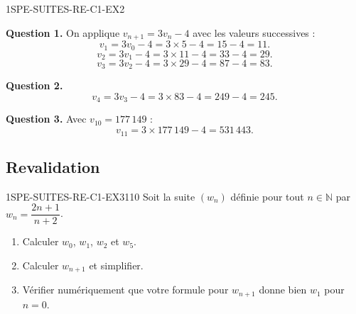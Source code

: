 
\begin{corrige}{1SPE-SUITES-RE-C1-EX2}


\textbf{Question 1.} On applique $v_{n+1} = 3v_n - 4$ avec les valeurs successives :
\[
v_1 = 3v_0 - 4 = 3 \times 5 - 4 = 15 - 4 = 11.
\]
\[
v_2 = 3v_1 - 4 = 3 \times 11 - 4 = 33 - 4 = 29.
\]
\[
v_3 = 3v_2 - 4 = 3 \times 29 - 4 = 87 - 4 = 83.
\]

\textbf{Question 2.}
\[
v_4 = 3v_3 - 4 = 3 \times 83 - 4 = 249 - 4 = 245.
\]


\textbf{Question 3.} Avec $v_{10} = 177\,149$ :
\[
v_{11} = 3 \times 177\,149 - 4 = 531\,443.
\]

\end{corrige}

\subsection*{Revalidation}


\begin{exercice}{1SPE-SUITES-RE-C1-EX3}{1}{10}
Soit la suite $(w_n)$ définie pour tout $n \in \mathbb{N}$ par $w_n = \dfrac{2n + 1}{n + 2}$.
\begin{enumerate}
  \item Calculer $w_0$, $w_1$, $w_2$ et $w_5$.
  \item Calculer $w_{n+1}$ et simplifier.
  \item Vérifier numériquement que votre formule pour $w_{n+1}$ donne bien $w_1$ pour $n = 0$.
\end{enumerate}
\end{exercice}


